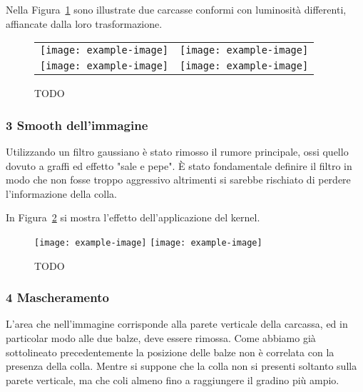 Nella Figura~\ref{fig:equalizzazione} sono illustrate due carcasse conformi con luminosità differenti, affiancate dalla loro trasformazione.
\begin{figure}[ht] %
  \begin{center}
    \begin{tabular}{cc}
      \texttt{[image: example-image]} &
      \texttt{[image: example-image]} \\
      \texttt{[image: example-image]} &
      \texttt{[image: example-image]}
    \end{tabular}
    \caption{TODO}
    \label{fig:equalizzazione}
  \end{center}
\end{figure}


\subsubsection{3 Smooth dell'immagine}
Utilizzando un filtro gaussiano è stato rimosso il rumore principale, ossi quello dovuto a graffi ed effetto "sale e pepe".
È stato fondamentale definire il filtro in modo che non fosse troppo aggressivo altrimenti si sarebbe rischiato di perdere l'informazione della colla.

In Figura~\ref{fig:smooth} si mostra l'effetto dell'applicazione del kernel.
\begin{figure}[ht] %
  \begin{center}
    \texttt{[image: example-image]}
    \texttt{[image: example-image]}
    \caption{TODO}
    \label{fig:smooth}
  \end{center}
\end{figure}

\subsubsection{4 Mascheramento}
L'area che nell'immagine corrisponde alla parete verticale della carcassa, ed in particolar modo alle due balze, deve essere rimossa.
Come abbiamo già sottolineato precedentemente la posizione delle balze non è correlata con la presenza della colla.
Mentre si suppone che la colla non si presenti soltanto sulla parete verticale, ma che coli almeno fino a raggiungere il gradino più ampio.


